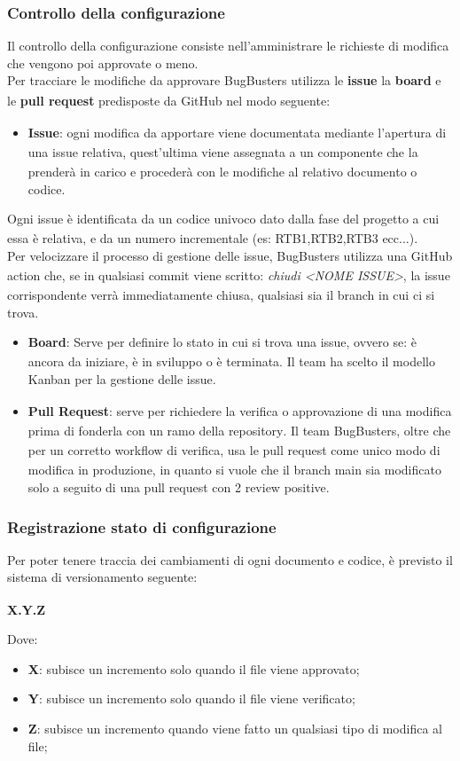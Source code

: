 \documentclass[a4paper,11pt]{article}
\newcommand{\G}{\textsubscript{\scalebox{0.6}{\textbf{G}}}}
\begin{document}
\subsubsection{Controllo della configurazione}
Il controllo  della configurazione consiste nell'amministrare le richieste di modifica che vengono poi approvate o meno.\\
Per tracciare le modifiche da approvare BugBusters utilizza le \textbf{issue}\G{} la \textbf{board} e le \textbf{pull request} predisposte da GitHub\G{} nel modo seguente:
\begin{itemize}
    \item \textbf{Issue\G{}}: ogni modifica da apportare viene documentata mediante l'apertura di una issue\G{} relativa, quest'ultima viene assegnata a un componente che la prenderà in carico e procederà con le modifiche al relativo documento o codice.
\end{itemize}
Ogni issue\G{} è identificata da un codice univoco dato dalla fase del progetto\G{} a cui essa è relativa, e da un numero incrementale (es: RTB1,RTB2,RTB3 ecc...).\\
Per velocizzare il processo di gestione delle issue\G{}, BugBusters utilizza una GitHub action che, se in qualsiasi commit viene scritto: \textit{chiudi <NOME ISSUE>}, la issue\G{} 
corrispondente verrà immediatamente chiusa, qualsiasi sia il branch in cui ci si trova.\\
\begin{itemize}
    \item \textbf{Board}: Serve per definire lo stato in cui si trova una issue\G{}, ovvero se: è ancora da iniziare, è in sviluppo o è terminata. Il team ha scelto il modello Kanban per la gestione delle issue\G{}.

    \item \textbf{Pull Request}: serve per richiedere la verifica\G{} o approvazione\G{} di una modifica prima di fonderla con un ramo della repository\G{}.
    Il team BugBusters, oltre che per un corretto workflow\G{} di verifica\G{}, usa le pull request come unico modo di modifica in produzione, in quanto si vuole che il branch main sia modificato solo a seguito di una pull request con 2 review positive.
\end{itemize}
\subsubsection{Registrazione stato di configurazione}
Per poter tenere traccia dei cambiamenti di ogni documento e codice, è previsto il sistema di versionamento\G{}{} seguente:
\begin{center}
    \textbf{X.Y.Z}
\end{center}
Dove:
\begin{itemize}
    \item \textbf{X}: subisce un incremento solo quando il file viene approvato{};
    \item \textbf{Y}: subisce un incremento solo quando il file viene verificato{};
    \item \textbf{Z}: subisce un incremento quando viene fatto un qualsiasi tipo di modifica al file;
\end{itemize}
\end{document}
